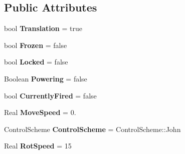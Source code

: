 \subsection*{Public Attributes}
\begin{DoxyCompactItemize}
\item 
\hypertarget{classDCEngine_1_1Components_1_1BallController_a696af17372a72b15f1fa26b129f16883}{bool {\bfseries Translation} = true}\label{classDCEngine_1_1Components_1_1BallController_a696af17372a72b15f1fa26b129f16883}

\item 
\hypertarget{classDCEngine_1_1Components_1_1BallController_adb1bf393d426d986abbda1631ad60e9f}{bool {\bfseries Frozen} = false}\label{classDCEngine_1_1Components_1_1BallController_adb1bf393d426d986abbda1631ad60e9f}

\item 
\hypertarget{classDCEngine_1_1Components_1_1BallController_a65c546f9f04910ff579bc017cb161cd1}{bool {\bfseries Locked} = false}\label{classDCEngine_1_1Components_1_1BallController_a65c546f9f04910ff579bc017cb161cd1}

\item 
\hypertarget{classDCEngine_1_1Components_1_1BallController_a98b551a71bccff201115dd38225916a6}{Boolean {\bfseries Powering} = false}\label{classDCEngine_1_1Components_1_1BallController_a98b551a71bccff201115dd38225916a6}

\item 
\hypertarget{classDCEngine_1_1Components_1_1BallController_ad24cde2fb8ccb87230a925b15cf0f8ee}{bool {\bfseries Currently\-Fired} = false}\label{classDCEngine_1_1Components_1_1BallController_ad24cde2fb8ccb87230a925b15cf0f8ee}

\item 
\hypertarget{classDCEngine_1_1Components_1_1BallController_a0c0f2d4c260e4ed2fe13c46581d55b57}{Real {\bfseries Move\-Speed} = 0.}\label{classDCEngine_1_1Components_1_1BallController_a0c0f2d4c260e4ed2fe13c46581d55b57}

\item 
\hypertarget{classDCEngine_1_1Components_1_1BallController_a7e27311d1be2db845f9c1f225c2619eb}{Control\-Scheme {\bfseries Control\-Scheme} = Control\-Scheme\-::\-John}\label{classDCEngine_1_1Components_1_1BallController_a7e27311d1be2db845f9c1f225c2619eb}

\item 
\hypertarget{classDCEngine_1_1Components_1_1BallController_a320a0d87553ffe869863de6e77d55bdf}{Real {\bfseries Rot\-Speed} = 15}\label{classDCEngine_1_1Components_1_1BallController_a320a0d87553ffe869863de6e77d55bdf}


\end{DoxyCompactItemize}
